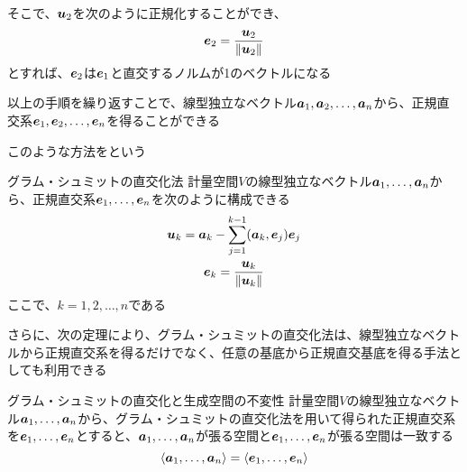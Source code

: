 \documentclass[../../../topic_linear-algebra]{subfiles}
\begin{document}
\br

そこで、$\vb*{u}_2$を次のように正規化することができ、
\begin{equation*}
  \vb*{e}_2 = \frac{\vb*{u}_2}{\|\vb*{u}_2\|}
\end{equation*}
とすれば、$\vb*{e}_2$は$\vb*{e}_1$と直交するノルムが1のベクトルになる

\sectionline

以上の手順を繰り返すことで、線型独立なベクトル$\vb*{a}_1, \vb*{a}_2, \ldots, \vb*{a}_n$から、正規直交系$\vb*{e}_1, \vb*{e}_2, \ldots, \vb*{e}_n$を得ることができる

\br

このような方法をという

\begin{theorem}{グラム・シュミットの直交化法}
  計量空間$V$の線型独立なベクトル$\vb*{a}_1, \ldots, \vb*{a}_n$から、正規直交系$\vb*{e}_1, \ldots, \vb*{e}_n$を次のように構成できる
  \begin{gather*}
    \vb*{u}_k = \vb*{a}_k - \sum_{j=1}^{k-1} (\vb*{a}_k, \vb*{e}_j) \vb*{e}_j \\
    \vb*{e}_k = \frac{\vb*{u}_k}{\|\vb*{u}_k\|}
  \end{gather*}
  ここで、$k = 1, 2, \ldots, n$である
\end{theorem}

\sectionline

さらに、次の定理により、グラム・シュミットの直交化法は、線型独立なベクトルから正規直交系を得るだけでなく、任意の基底から正規直交基底を得る手法としても利用できる

\begin{theorem}{グラム・シュミットの直交化と生成空間の不変性}
  計量空間$V$の線型独立なベクトル$\vb*{a}_1, \ldots, \vb*{a}_n$から、グラム・シュミットの直交化法を用いて得られた正規直交系を$\vb*{e}_1, \ldots, \vb*{e}_n$とすると、$\vb*{a}_1,\ldots,\vb*{a}_n$が張る空間と$\vb*{e}_1,\ldots,\vb*{e}_n$が張る空間は一致する
  \begin{equation*}
    \langle \vb*{a}_1, \ldots, \vb*{a}_n \rangle = \langle \vb*{e}_1, \ldots, \vb*{e}_n \rangle
  \end{equation*}
\end{theorem}
\end{document}
